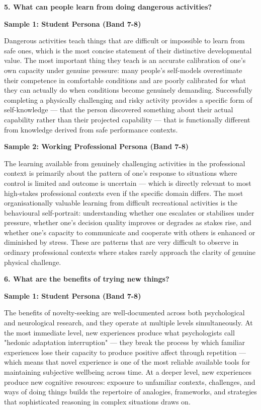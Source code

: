 \separator

\begin{ieltsquestion}
\textbf{5. What can people learn from doing dangerous activities?}
\end{ieltsquestion}
\textbf{Sample 1: Student Persona (Band 7-8)}

Dangerous activities teach things that are difficult or impossible to learn from safe ones, which is the most concise statement of their distinctive developmental value. The most important thing they teach is an accurate calibration of one's own capacity under genuine pressure: many people's self-models overestimate their competence in comfortable conditions and are poorly calibrated for what they can actually do when conditions become genuinely demanding. Successfully completing a physically challenging and risky activity provides a specific form of self-knowledge — that the person discovered something about their actual capability rather than their projected capability — that is functionally different from knowledge derived from safe performance contexts.

\textbf{Sample 2: Working Professional Persona (Band 7-8)}

The learning available from genuinely challenging activities in the professional context is primarily about the pattern of one's response to situations where control is limited and outcome is uncertain — which is directly relevant to most high-stakes professional contexts even if the specific domain differs. The most organisationally valuable learning from difficult recreational activities is the behavioural self-portrait: understanding whether one escalates or stabilises under pressure, whether one's decision quality improves or degrades as stakes rise, and whether one's capacity to communicate and cooperate with others is enhanced or diminished by stress. These are patterns that are very difficult to observe in ordinary professional contexts where stakes rarely approach the clarity of genuine physical challenge.

\separator

\begin{ieltsquestion}
\textbf{6. What are the benefits of trying new things?}
\end{ieltsquestion}
\textbf{Sample 1: Student Persona (Band 7-8)}

The benefits of novelty-seeking are well-documented across both psychological and neurological research, and they operate at multiple levels simultaneously. At the most immediate level, new experiences produce what psychologists call "hedonic adaptation interruption" — they break the process by which familiar experiences lose their capacity to produce positive affect through repetition — which means that novel experience is one of the most reliable available tools for maintaining subjective wellbeing across time. At a deeper level, new experiences produce new cognitive resources: exposure to unfamiliar contexts, challenges, and ways of doing things builds the repertoire of analogies, frameworks, and strategies that sophisticated reasoning in complex situations draws on.

